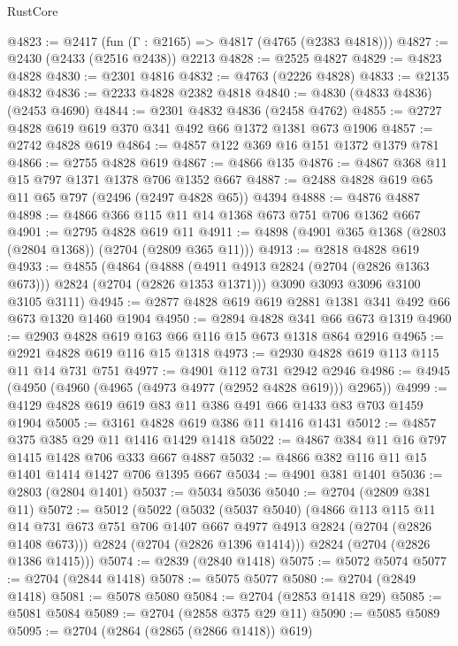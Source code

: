 \begin{lexlean}{RustCore}
\begin{coremodule}
@4823 := @2417 (fun (Γ : @2165) => @4817 (@4765 (@2383 @4818)))
@4827 := @2430 (@2433 (@2516 @2438)) @2213
@4828 := @2525 @4827
@4829 := @4823 @4828
@4830 := @2301 @4816
@4832 := @4763 (@2226 @4828)
@4833 := @2135 @4832
@4836 := @2233 @4828 @2382 @4818
@4840 := @4830 (@4833 @4836) (@2453 @4690)
@4844 := @2301 @4832 @4836 (@2458 @4762)
@4855 := @2727 @4828 @619 @619 @370 @341 @492 @66 @1372 @1381 @673 @1906
@4857 := @2742 @4828 @619
@4864 := @4857 @122 @369 @16 @151 @1372 @1379 @781
@4866 := @2755 @4828 @619
@4867 := @4866 @135
@4876 := @4867 @368 @11 @15 @797 @1371 @1378 @706 @1352 @667
@4887 := @2488 @4828 @619 @65 @11 @65 @797 (@2496 (@2497 @4828 @65)) @4394
@4888 := @4876 @4887
@4898 := @4866 @366 @115 @11 @14 @1368 @673 @751 @706 @1362 @667
@4901 := @2795 @4828 @619 @11
@4911 := @4898 (@4901 @365 @1368 (@2803 (@2804 @1368)) (@2704 (@2809 @365 @11)))
@4913 := @2818 @4828 @619
@4933 := @4855
    (@4864
      (@4888 (@4911 @4913 @2824 (@2704 (@2826 @1363 @673))) @2824 (@2704 (@2826 @1353 @1371)))
      @3090
      @3093
      @3096
      @3100
      @3105
      @3111)
@4945 := @2877 @4828 @619 @619 @2881 @1381 @341 @492 @66 @673 @1320 @1460 @1904
@4950 := @2894 @4828 @341 @66 @673 @1319
@4960 := @2903 @4828 @619 @163 @66 @116 @15 @673 @1318 @864 @2916
@4965 := @2921 @4828 @619 @116 @15 @1318
@4973 := @2930 @4828 @619 @113 @115 @11 @14 @731 @751
@4977 := @4901 @112 @731 @2942 @2946
@4986 := @4945 (@4950 (@4960 (@4965 (@4973 @4977 (@2952 @4828 @619))) @2965))
@4999 := @4129 @4828 @619 @619 @83 @11 @386 @491 @66 @1433 @83 @703 @1459 @1904
@5005 := @3161 @4828 @619 @386 @11 @1416 @1431
@5012 := @4857 @375 @385 @29 @11 @1416 @1429 @1418
@5022 := @4867 @384 @11 @16 @797 @1415 @1428 @706 @333 @667 @4887
@5032 := @4866 @382 @116 @11 @15 @1401 @1414 @1427 @706 @1395 @667
@5034 := @4901 @381 @1401
@5036 := @2803 (@2804 @1401)
@5037 := @5034 @5036
@5040 := @2704 (@2809 @381 @11)
@5072 := @5012
    (@5022
      (@5032
        (@5037 @5040)
        (@4866
          @113
          @115
          @11
          @14
          @731
          @673
          @751
          @706
          @1407
          @667
          @4977
          @4913
          @2824
          (@2704 (@2826 @1408 @673)))
        @2824
        (@2704 (@2826 @1396 @1414)))
      @2824
      (@2704 (@2826 @1386 @1415)))
@5074 := @2839 (@2840 @1418)
@5075 := @5072 @5074
@5077 := @2704 (@2844 @1418)
@5078 := @5075 @5077
@5080 := @2704 (@2849 @1418)
@5081 := @5078 @5080
@5084 := @2704 (@2853 @1418 @29)
@5085 := @5081 @5084
@5089 := @2704 (@2858 @375 @29 @11)
@5090 := @5085 @5089
@5095 := @2704 (@2864 (@2865 (@2866 @1418)) @619)

\end{coremodule}
\end{lexlean}
